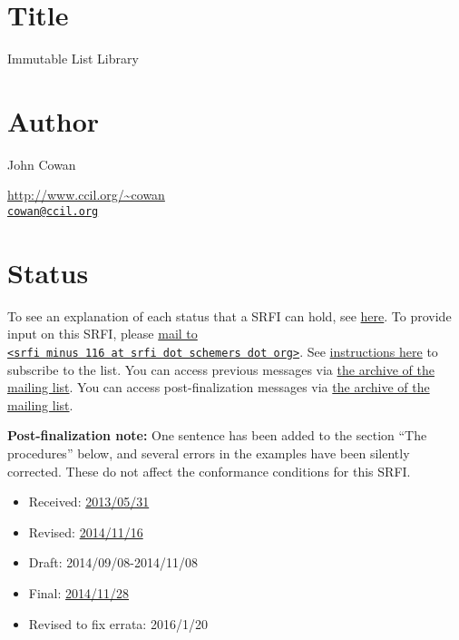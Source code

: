 \section{Title}\label{title}

Immutable List Library

\section{Author}\label{author}

John Cowan

\url{http://www.ccil.org/~cowan}\\
\href{mailto:cowan@ccil.org}{\nolinkurl{cowan@ccil.org}}

\section{Status}\label{status}

To see an explanation of each status that a SRFI can hold, see
\href{http://srfi.schemers.org/srfi-process.html}{here}. To provide
input on this SRFI, please
\href{mailto:srfi\%20minus\%20116\%20at\%20srfi\%20dot\%20schemers\%20dot\%20org}{mail
to
\texttt{\textless{}srfi\ minus\ 116\ at\ srfi\ dot\ schemers\ dot\ org\textgreater{}}}.
See \href{../srfi-list-subscribe.html}{instructions here} to subscribe
to the list. You can access previous messages via
\href{mail-archive/maillist.html}{the archive of the mailing list}. You
can access post-finalization messages via
\href{http://srfi.schemers.org/srfi-111/post-mail-archive/maillist.html}{the
archive of the mailing list}.

\textbf{Post-finalization note:} One sentence has been added to the
section ``The procedures'' below, and several errors in the examples
have been silently corrected. These do not affect the conformance
conditions for this SRFI.

\begin{itemize}
\tightlist
\item
  Received:
  \href{http://srfi.schemers.org/srfi-116/srfi-116-1.1.html}{2013/05/31}
\item
  Revised:
  \href{http://srfi.schemers.org/srfi-116/srfi-116-1.4.html}{2014/11/16}
\item
  Draft: 2014/09/08-2014/11/08
\item
  Final:
  \href{http://srfi.schemers.org/srfi-116/srfi-116-1.5.html}{2014/11/28}
\item
  Revised to fix errata: 2016/1/20
\end{itemize}

